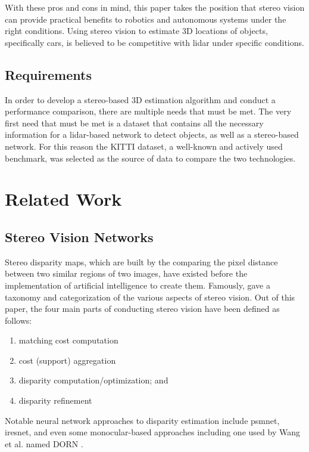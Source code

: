 With these pros and cons in mind, this paper takes the position that stereo vision can provide practical benefits to robotics and autonomous systems under the right conditions. Using stereo vision to estimate 3D locations of objects, specifically cars, is believed to be competitive with lidar under specific conditions.


\subsection{Requirements}
In order to develop a stereo-based 3D estimation algorithm and conduct a performance comparison, there are multiple needs that must be met. The very first need that must be met is a dataset that contains all the necessary information for a lidar-based network to detect objects, as well as a stereo-based network. For this reason the KITTI dataset, a well-known and actively used benchmark, was selected as the source of data to compare the two technologies.

\section{Related Work}

\subsection{Stereo Vision Networks}
Stereo disparity maps, which are built by the comparing the pixel distance between two similar regions of two images, have existed before the implementation of artificial intelligence to create them. Famously, \cite{scharstein_taxonomy_2002} gave a taxonomy and categorization of the various aspects of stereo vision. Out of this paper, the four main parts of conducting stereo vision have been defined as follows:

\begin{enumerate} \itemsep=-0.5em
    \item matching cost computation
    \item cost (support) aggregation
    \item disparity computation/optimization; and
    \item disparity refinement
\end{enumerate}

Notable neural network approaches to disparity estimation include psmnet, iresnet, and even some monocular-based approaches including one used by Wang et al. named DORN \cite{DBLP:journals/corr/abs-1806-02446}.

